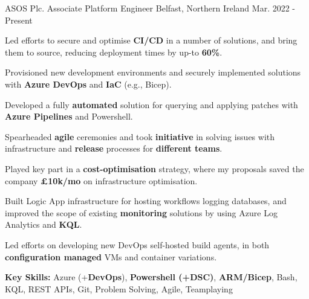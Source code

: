 

\begin{cventries}

  \cventry
  	{ASOS Plc.} %
    {Associate Platform Engineer} %
    {Belfast, Northern Ireland} %
    {Mar. 2022 - Present} %
    {
      \begin{cvitems} %
        \item {Led efforts to secure and optimise \textbf{CI/CD} in a number of solutions, and bring them to source, reducing deployment times by up-to \textbf{60\%}.}
        \item {Provisioned new development environments and securely implemented solutions with \textbf{Azure DevOps} and \textbf{IaC} (e.g., Bicep).}
        \item {Developed a fully \textbf{automated} solution for querying and applying patches with \textbf{Azure Pipelines} and Powershell.}
        \item {Spearheaded \textbf{agile} ceremonies and took \textbf{initiative} in solving issues with infrastructure and \textbf{release} processes for \textbf{different teams}.}
        \item {Played key part in a \textbf{cost-optimisation} strategy, where my proposals saved the company \textbf{\approx £10k/mo} on infrastructure optimisation.}
        \item {Built Logic App infrastructure for hosting workflows logging databases, and improved the scope of existing \textbf{monitoring} solutions by using Azure Log Analytics and \textbf{KQL}.}
        \item {Led efforts on developing new DevOps self-hosted build agents, in both \textbf{configuration managed} VMs and container variations.}
        \item {\textbf{Key Skills:} Azure (+\textbf{DevOps}), \textbf{Powershell (+DSC)}, \textbf{ARM/Bicep}, Bash, KQL, REST APIs, Git, Problem Solving, Agile, Teamplaying}
      \end{cvitems}
    }


\end{cventries}
